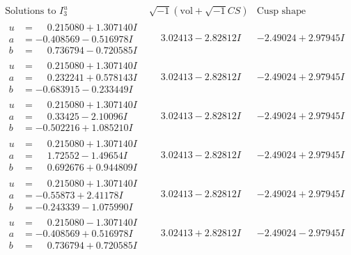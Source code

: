 \documentclass[1p]{elsarticle_modified}
\theoremstyle{definition}
\newcommand{\I}{\sqrt{-1}}
\begin{document}
$$\begin{array}{c|c|c}  
\text{Solutions to }I^u_{3}& \I (\text{vol} + \sqrt{-1}CS) & \text{Cusp shape}\\
 \hline 
\begin{aligned}
u &= \phantom{-}0.215080 + 1.307140 I \\
a &= -0.408569 - 0.516978 I \\
b &= \phantom{-}0.736794 - 0.720585 I\end{aligned}
 & \phantom{-}3.02413 - 2.82812 I & -2.49024 + 2.97945 I \\ \hline\begin{aligned}
u &= \phantom{-}0.215080 + 1.307140 I \\
a &= \phantom{-}0.232241 + 0.578143 I \\
b &= -0.683915 - 0.233449 I\end{aligned}
 & \phantom{-}3.02413 - 2.82812 I & -2.49024 + 2.97945 I \\ \hline\begin{aligned}
u &= \phantom{-}0.215080 + 1.307140 I \\
a &= \phantom{-}0.33425 - 2.10096 I \\
b &= -0.502216 + 1.085210 I\end{aligned}
 & \phantom{-}3.02413 - 2.82812 I & -2.49024 + 2.97945 I \\ \hline\begin{aligned}
u &= \phantom{-}0.215080 + 1.307140 I \\
a &= \phantom{-}1.72552 - 1.49654 I \\
b &= \phantom{-}0.692676 + 0.944809 I\end{aligned}
 & \phantom{-}3.02413 - 2.82812 I & -2.49024 + 2.97945 I \\ \hline\begin{aligned}
u &= \phantom{-}0.215080 + 1.307140 I \\
a &= -0.55873 + 2.41178 I \\
b &= -0.243339 - 1.075990 I\end{aligned}
 & \phantom{-}3.02413 - 2.82812 I & -2.49024 + 2.97945 I \\ \hline\begin{aligned}
u &= \phantom{-}0.215080 - 1.307140 I \\
a &= -0.408569 + 0.516978 I \\
b &= \phantom{-}0.736794 + 0.720585 I\end{aligned}
 & \phantom{-}3.02413 + 2.82812 I & -2.49024 - 2.97945 I \\ \hline\begin{aligned}

\end{aligned}
\end{array}$$
\end{document}
